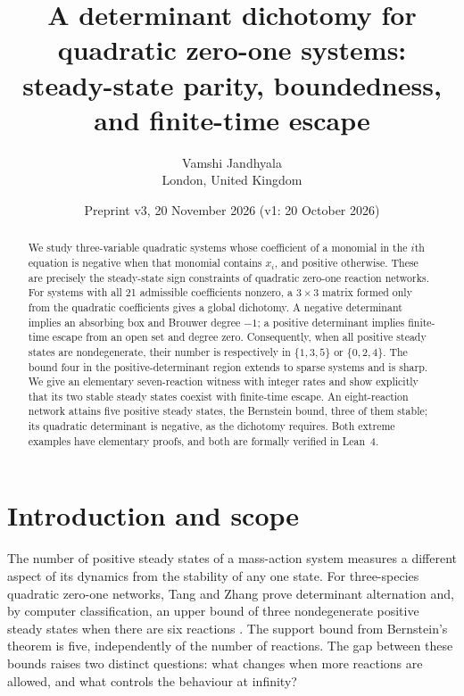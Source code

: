 \documentclass[11pt]{article}
\title{A determinant dichotomy for quadratic zero-one systems:\\steady-state parity, boundedness, and finite-time escape}
\author{Vamshi Jandhyala\\\small London, United Kingdom}
\date{Preprint v3, 20 November 2026 (v1: 20 October 2026)}
\theoremstyle{remark}\newtheorem{remark}[theorem]{Remark}
\begin{document}
\maketitle
\begin{abstract}
We study three-variable quadratic systems whose coefficient of a monomial in the
$i$th equation is negative when that monomial contains $x_i$, and positive
otherwise. These are precisely the steady-state sign constraints of quadratic
zero-one reaction networks. For systems with all 21 admissible coefficients
nonzero, a $3\times3$ matrix formed only from the quadratic coefficients gives a
global dichotomy. A negative determinant implies an absorbing box and Brouwer
degree $-1$; a positive determinant implies finite-time escape from an open set
and degree zero. Consequently, when all positive steady states are nondegenerate,
their number is respectively in $\{1,3,5\}$ or $\{0,2,4\}$. The bound four in the
positive-determinant region extends to sparse systems and is sharp. We give an
elementary seven-reaction witness with integer rates and show explicitly that
its two stable steady states coexist with finite-time escape. An eight-reaction
network attains five positive steady states, the Bernstein bound, three of them
stable; its quadratic determinant is negative, as the dichotomy requires. Both
extreme examples have elementary proofs, and both are formally verified in Lean~4.
\end{abstract}

\section{Introduction and scope}
The number of positive steady states of a mass-action system measures a different
aspect of its dynamics from the stability of any one state. For three-species
quadratic zero-one networks, Tang and Zhang prove determinant alternation and,
by computer classification, an upper bound of three nondegenerate positive
steady states when there are six reactions \cite{TZ}. The support bound from
Bernstein's theorem is five, independently of the number of reactions. The gap
between these bounds raises two distinct questions: what changes when more
reactions are allowed, and what controls the behaviour at infinity?
\end{document}
